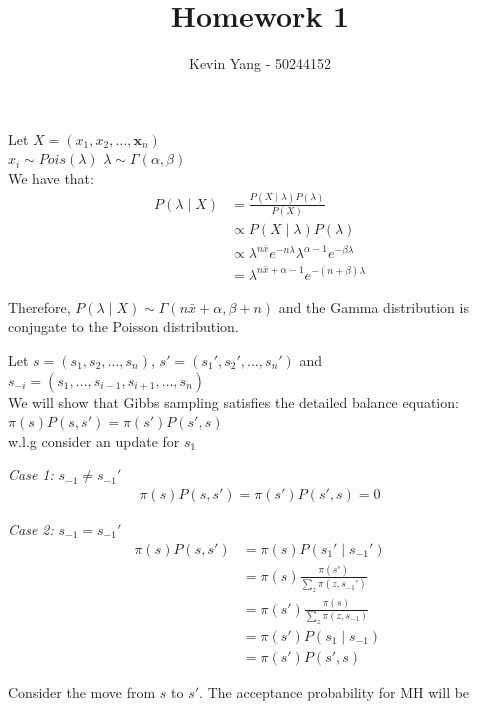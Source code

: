 \documentclass[10pt]{homeworg}
\title{Homework 1}
\author{Kevin Yang - 50244152}
\begin{document}
\maketitle

\exercise
Let $X = (x_1, x_2, \ldots, \boldsymbol x_n)$ \\
\vspace{0.5cm}
$x_i \sim Pois(\lambda)$  \hspace{2cm} $\lambda \sim \Gamma(\alpha, \beta)$
\\
We have that:
\begin{align*}
P(\lambda \mid X) &= \frac{P(X \mid \lambda)P(\lambda)}{P(X)}\\
				  &\propto P(X \mid \lambda)P(\lambda)\\
				  &\propto \lambda^{n\bar{x}}e^{-n\lambda}\lambda^{\alpha-1}e^{-\beta\lambda}\\
				  &= \lambda^{n\bar{x}+\alpha-1}e^{-(n+\beta)\lambda}
\end{align*}

Therefore, $P(\lambda \mid X) \sim \Gamma(n\bar{x}+\alpha, \beta+n)$ and the Gamma distribution is conjugate to the Poisson distribution.

\exercise
Let $s = (s_1, s_2, \ldots, s_n)$, $s' = (s_1', s_2', \ldots, s_n')$ and $s_{-i} = (s_1, \ldots, s_{i-1}, s_{i+1}, \ldots, s_n)$\\
We will show that Gibbs sampling satisfies the detailed balance equation: $\pi(s)P(s,s')=\pi(s')P(s',s)$\\

w.l.g consider an update for $s_1$\\
\vspace{0.5cm}

\textit{Case 1:} $s_{-1} \neq s_{-1}'$
\begin{align*}
\pi(s)P(s,s') = \pi(s')P(s',s) = 0
\end{align*}


\textit{Case 2:} $s_{-1} = s_{-1}'$
\begin{align*}
\pi(s)P(s,s') &= \pi(s)P(s_1' \mid s_{-1}')\\
			  &= \pi(s)\frac{\pi(s')}{\sum_z \pi(z, s_{-1}')}\\
			  &= \pi(s')\frac{\pi(s)}{\sum_z \pi(z, s_{-1})}\\
			  &= \pi(s')P(s_1 \mid s_{-1})\\
			  &= \pi(s')P(s',s)
\end{align*}

Consider the move from $s$ to $s'$. The acceptance probability for MH will be
\end{document}
